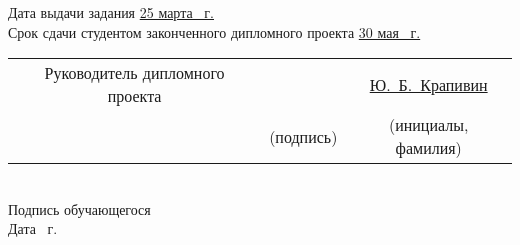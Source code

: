 {  \vspace{2em}

  Дата выдачи задания \uline{25 марта \the\year{}~г.}\lineunderscore\\
  Срок сдачи студентом законченного дипломного проекта \uline{30 мая \the\year{}~г.}\lineunderscore\\

  \begin{tabularx}{\textwidth}{@{}c c c}
    Руководитель дипломного проекта & \uline{\hspace*{6em}} & \hspace{1.2em}\uline{Ю.~Б.~Крапивин\hspace{3em}}\\
    & {\footnotesize(подпись)} & {\footnotesize(инициалы, фамилия)}\\
  \end{tabularx}\\

  Подпись обучающегося \uline{\hspace*{10em}}\\[0.5em]
  Дата \underline{\hspace*{2em}} \underline{\hspace*{5.7em}} \the\year{}~г.

  \restoregeometry
}